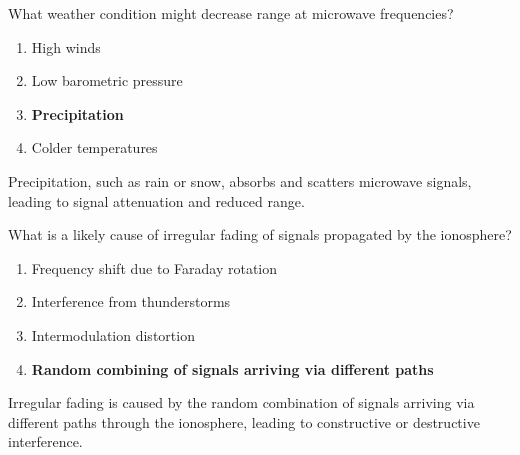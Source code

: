 
\begin{tcolorbox}[colback=gray!10!white,colframe=black!75!black,title={T3A07}]
    What weather condition might decrease range at microwave frequencies?
    \begin{enumerate}[label=\Alph*,noitemsep]
        \item High winds
        \item Low barometric pressure
        \item \textbf{Precipitation}
        \item Colder temperatures
    \end{enumerate}
\end{tcolorbox}
Precipitation, such as rain or snow, absorbs and scatters microwave signals, leading to signal attenuation and reduced range.


\begin{tcolorbox}[colback=gray!10!white,colframe=black!75!black,title={T3A08}]
    What is a likely cause of irregular fading of signals propagated by the ionosphere?
    \begin{enumerate}[label=\Alph*,noitemsep]
        \item Frequency shift due to Faraday rotation
        \item Interference from thunderstorms
        \item Intermodulation distortion
        \item \textbf{Random combining of signals arriving via different paths}
    \end{enumerate}
\end{tcolorbox}
Irregular fading is caused by the random combination of signals arriving via different paths through the ionosphere, leading to constructive or destructive interference.


